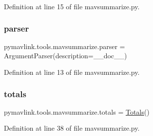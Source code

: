 Definition at line 15 of file mavsummarize.\+py.

\mbox{\label{namespacepymavlink_1_1tools_1_1mavsummarize_a3ba68eafe41ac6abee79b85aaba7971e}} 
\subsubsection{\texorpdfstring{parser}{parser}}
{\footnotesize\ttfamily pymavlink.\+tools.\+mavsummarize.\+parser = Argument\+Parser(description=\+\_\+\+\_\+doc\+\_\+\+\_\+)}



Definition at line 13 of file mavsummarize.\+py.

\mbox{\label{namespacepymavlink_1_1tools_1_1mavsummarize_adaec538b723dbbab18ae0166aaf4ee1d}} 
\subsubsection{\texorpdfstring{totals}{totals}}
{\footnotesize\ttfamily pymavlink.\+tools.\+mavsummarize.\+totals = \mbox{\hyperlink{classpymavlink_1_1tools_1_1mavsummarize_1_1Totals}{Totals}}()}



Definition at line 38 of file mavsummarize.\+py.

